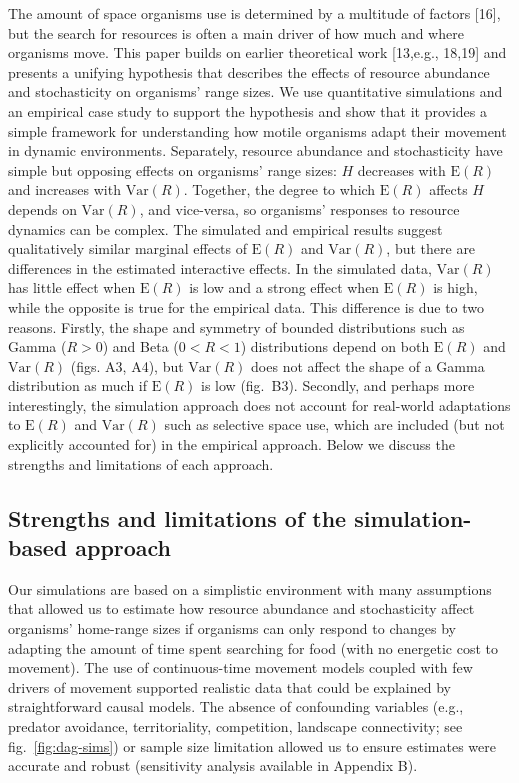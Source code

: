 \documentclass[
  12pt,
]{article}
\begin{document}
\noindent The amount of space organisms use is determined by a multitude of factors {[}16{]}, but the search for resources is often a main driver of how much and where organisms move. This paper builds on earlier theoretical work {[}13,e.g., 18,19{]} and presents a unifying hypothesis that describes the effects of resource abundance and stochasticity on organisms' range sizes. We use quantitative simulations and an empirical case study to support the hypothesis and show that it provides a simple framework for understanding how motile organisms adapt their movement in dynamic environments. Separately, resource abundance and stochasticity have simple but opposing effects on organisms' range sizes: \(H\) decreases with \(\text{E}(R)\) and increases with \(\text{Var}(R)\). Together, the degree to which \(\text{E}(R)\) affects \(H\) depends on \(\text{Var}(R)\), and vice-versa, so organisms' responses to resource dynamics can be complex. The simulated and empirical results suggest qualitatively similar marginal effects of \(\text{E}(R)\) and \(\text{Var}(R)\), but there are differences in the estimated interactive effects. In the simulated data, \(\text{Var}(R)\) has little effect when \(\text{E}(R)\) is low and a strong effect when \(\text{E}(R)\) is high, while the opposite is true for the empirical data. This difference is due to two reasons. Firstly, the shape and symmetry of bounded distributions such as Gamma (\(R > 0\)) and Beta (\(0 < R < 1\)) distributions depend on both \(\text{E}(R)\) and \(\text{Var}(R)\) (figs. A3, A4), but \(\text{Var}(R)\) does not affect the shape of a Gamma distribution as much if \(\text{E}(R)\) is low (fig.~B3). Secondly, and perhaps more interestingly, the simulation approach does not account for real-world adaptations to \(\text{E}(R)\) and \(\text{Var}(R)\) such as selective space use, which are included (but not explicitly accounted for) in the empirical approach. Below we discuss the strengths and limitations of each approach.

\subsection{Strengths and limitations of the simulation-based approach}\label{strengths-and-limitations-of-the-simulation-based-approach}

\noindent Our simulations are based on a simplistic environment with many assumptions that allowed us to estimate how resource abundance and stochasticity affect organisms' home-range sizes if organisms can only respond to changes by adapting the amount of time spent searching for food (with no energetic cost to movement). The use of continuous-time movement models coupled with few drivers of movement supported realistic data that could be explained by straightforward causal models. The absence of confounding variables (e.g., predator avoidance, territoriality, competition, landscape connectivity; see fig.~\ref{fig:dag-sims}) or sample size limitation allowed us to ensure estimates were accurate and robust (sensitivity analysis available in Appendix B).
\end{document}

